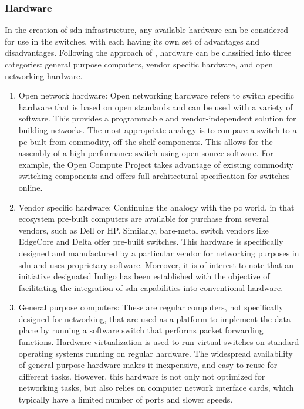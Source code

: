 \subsubsection{Hardware}
In the creation of \gls{sdn} infrastructure, any available hardware can be considered for use in the switches, with each having its own set of advantages and disadvantages. Following the approach of \cite{xia_survey_2015}, hardware can be classified into three categories: general purpose computers, vendor specific hardware, and open networking hardware. 


\begin{enumerate}
\item Open network hardware: 
    Open networking hardware refers to switch specific hardware that is based on open standards and can be used with a variety of software. This provides a programmable and vendor-independent solution for building networks. The most appropriate analogy is to compare a switch to a \gls{pc} built from commodity, off-the-shelf components. This allows for the assembly of a high-performance switch\cite{peterson_software-defined_2021} using open source software. For example, the Open Compute Project takes advantage of existing commodity switching components and offers full architectural specification for switches online\cite{noauthor_open_nodate-1}.   

\item Vendor specific hardware:
    Continuing the analogy with the \gls{pc} world, in that ecosystem pre-built computers are available for purchase from several vendors, such as Dell or HP. Similarly, bare-metal switch vendors like EdgeCore and Delta offer pre-built switches\cite{peterson_software-defined_2021}. This hardware is specifically designed and manufactured by a particular vendor for networking purposes in \gls{sdn} and uses proprietary software. Moreover, it is of interest to note that an initiative designated Indigo\cite{noauthor_indigo_nodate} has been established with the objective of facilitating the integration of \gls{sdn} capabilities into conventional hardware.

\item General purpose computers:
    These are regular computers, not specifically designed for networking, that are used as a platform to implement the data plane by running a software switch that performs packet forwarding functions. Hardware virtualization is used to run virtual switches on standard operating systems running on regular hardware. The widespread availability of general-purpose hardware makes it inexpensive, and easy to reuse for different tasks. However, this hardware is not only not optimized for networking tasks, but also relies on computer network interface cards, which typically have a limited number of ports and slower speeds.
\end{enumerate}

